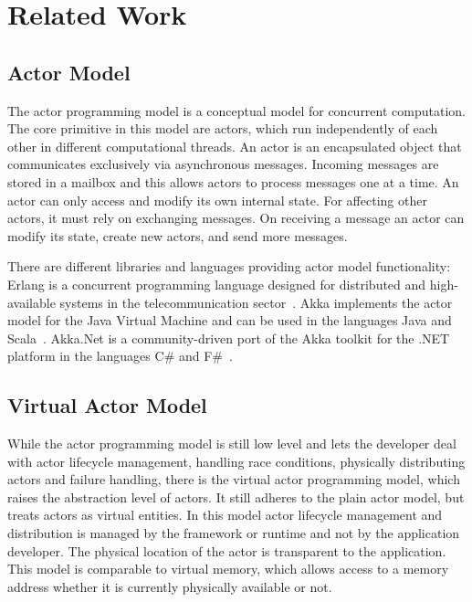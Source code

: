 
\section{Related Work}

  \subsection{Actor Model}
  The actor programming model is a conceptual model for concurrent computation.
  The core primitive in this model are actors, which run independently of each other in different computational threads.
  An actor is an encapsulated object that communicates exclusively via asynchronous messages.
  Incoming messages are stored in a mailbox and this allows actors to process messages one at a time.
  An actor can only access and modify its own internal state.
  For affecting other actors, it must rely on exchanging messages.
  On receiving a message an actor can modify its state, create new actors, and send more messages.

  There are different libraries and languages providing actor model functionality:
  Erlang is a concurrent programming language designed for distributed and high-available systems in the telecommunication sector~\cite{armstrong:erlang}.
  Akka implements the actor model for the Java Virtual Machine and can be used in the languages Java and Scala~\cite{akka}.
  Akka.Net is a community-driven port of the Akka toolkit for the .NET platform in the languages C\# and F\#~\cite{akka.net}.

  \subsection{Virtual Actor Model}
  While the actor programming model is still low level and lets the developer deal with actor lifecycle management, handling race conditions, physically distributing actors and failure handling, there is the virtual actor programming model, which raises the abstraction level of actors.
  It still adheres to the plain actor model, but treats actors as virtual entities.
  In this model actor lifecycle management and distribution is managed by the framework or runtime and not by the application developer.
  The physical location of the actor is transparent to the application.
  This model is comparable to virtual memory, which allows access to a memory address whether it is currently physically available or not.

